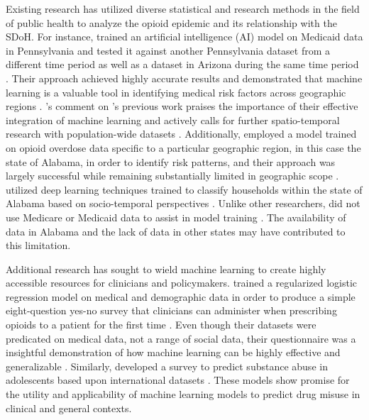 \documentclass[journal]{IEEEtran}
\begin{document}
    Existing research has utilized diverse statistical and research methods in the field of public health to analyze the opioid epidemic and its relationship with the SDoH. For instance, \citeauthor{lo-ciganicDevelopingValidatingMachinelearning2022} trained an artificial intelligence (AI) model on Medicaid data in Pennsylvania and tested it against another Pennsylvania dataset from a different time period as well as a dataset in Arizona during the same time period \cite{lo-ciganicDevelopingValidatingMachinelearning2022}. Their approach achieved highly accurate results and demonstrated that machine learning is a valuable tool in identifying medical risk factors across geographic regions \cite{lo-ciganicDevelopingValidatingMachinelearning2022}. \citeauthor{allenOpportunitiesOpioidOverdose2022}'s comment on \citeauthor{lo-ciganicDevelopingValidatingMachinelearning2022}'s previous work praises the importance of their effective integration of machine learning and actively calls for further spatio-temporal research with population-wide datasets \cite{allenOpportunitiesOpioidOverdose2022}. Additionally, \citeauthor{partonMachineLearningApproach2026} employed a model trained on opioid overdose data specific to a particular geographic region, in this case the state of Alabama, in order to identify risk patterns, and their approach was largely successful while remaining substantially limited in geographic scope \cite{partonMachineLearningApproach2026}. \citeauthor{wuDeepLearningbasedSpatiotemporal2026} utilized deep learning techniques trained to classify households within the state of Alabama based on socio-temporal perspectives \cite{wuDeepLearningbasedSpatiotemporal2026}. Unlike other researchers, \citeauthor{wuDeepLearningbasedSpatiotemporal2026} did not use Medicare or Medicaid data to assist in model training \cite{wuDeepLearningbasedSpatiotemporal2026}. The availability of data in Alabama and the lack of data in other states may have contributed to this limitation.

    Additional research has sought to wield machine learning to create highly accessible resources for clinicians and policymakers. \citeauthor{repsWisdomCROUDDevelopment2020} trained a regularized logistic regression model on medical and demographic data in order to produce a simple eight-question yes-no survey that clinicians can administer when prescribing opioids to a patient for the first time \cite{repsWisdomCROUDDevelopment2020}. Even though their datasets were predicated on medical data, not a range of social data, their questionnaire was a insightful demonstration of how machine learning can be highly effective and generalizable \cite{repsWisdomCROUDDevelopment2020}. Similarly, \citeauthor{kimMachineLearningBasedPrediction2025} developed a survey to predict substance abuse in adolescents based upon international datasets \cite{kimMachineLearningBasedPrediction2025}. These models show promise for the utility and applicability of machine learning models to predict drug misuse in clinical and general contexts.
\end{document}

